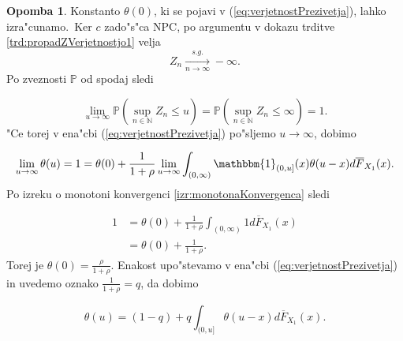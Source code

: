 \documentclass[12pt, a4paper, reqno]{amsart}
\theoremstyle{definition}
\newtheorem{opomba}[definicija]{Opomba}
\theoremstyle{plain}
\newcommand{\N}{\mathbb{N}}
\newcommand{\Prob}{\mathbb{P}}
\newcommand{\1}{\mathds{1}}
\newcommand*{\refPriloga}[1]{%
  \begingroup
    \hypersetup{
      linkcolor=red,
      linkbordercolor=red,
    }%
    \ref{#1}%
  \endgroup
}
\begin{document}
    \begin{opomba}
        Konstanto $\theta(0)$, ki se pojavi v (\ref{eq:verjetnostPrezivetja}), lahko izra"cunamo.\ Ker $c$ zado"s"ca NPC, po argumentu v dokazu trditve
        \ref{trd:propadZVerjetnostjo1} velja 
        \begin{equation*}
            Z_n \xrightarrow[n\to\infty]{s.g.} -\infty.
        \end{equation*}
        Po zveznosti $\Prob$ od spodaj sledi

        \begin{equation*}
            \lim_{u\to\infty}\Prob\left(\sup_{n\in\N}Z_n \leq u\right) = \Prob\left(\sup_{n\in\N}Z_n \leq \infty\right) = 1.
        \end{equation*}
        "Ce torej v ena"cbi (\ref{eq:verjetnostPrezivetja}) po"sljemo $u\to\infty$, dobimo

        \begin{equation*}
            \lim_{u\to\infty}\theta(u) = 1 = \theta(0) + \frac{1}{1 + \rho}\lim_{u\to\infty}\int_{(0, \infty)}\mathbbm{1}_{(0, u]}(x)\theta(u - x)d\overline{F}_{X_1}(x). \\
        \end{equation*}
        Po izreku o monotoni konvergenci \refPriloga{izr:monotonaKonvergenca} sledi

        \begin{align*}
            1 &= \theta(0) + \frac{1}{1 + \rho}\int_{(0, \infty)}1d\overline{F}_{X_1}(x) \\
             &= \theta(0) + \frac{1}{1 + \rho}.
        \end{align*}
        Torej je $\theta(0) = \frac{\rho}{1 + \rho}$.
        Enakost upo"stevamo v ena"cbi (\ref{eq:verjetnostPrezivetja}) in uvedemo oznako $\frac{1}{1 + \rho} = q$, da dobimo

        \begin{equation}
            \theta(u) = (1 - q) + q\int_{(0, u]}\theta(u - x)d\overline{F}_{X_1}(x).
            \label{eq:verjetnostPrezivetja3}
        \end{equation}
        \label{op:verjetnostPrezivetja2}
    \end{opomba}
\end{document}
